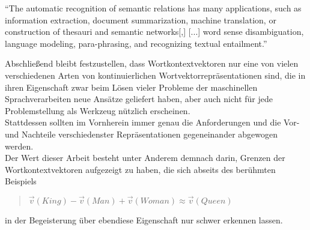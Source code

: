 \begin{itquote}
    ``The automatic recognition of semantic relations has many applications, such as information extraction,
    document summarization, machine translation, or construction of thesauri and semantic networks[,] [...]
    word sense disambiguation, language modeling, para-phrasing, and recognizing textual entailment.''
\end{itquote}

Abschließend bleibt festzustellen, dass Wortkontextvektoren nur eine von vielen verschiedenen Arten von kontinuierlichen
Wortvektorrepräsentationen sind, die in ihren Eigenschaft zwar beim Lösen vieler Probleme der maschinellen Sprachverarbeiten
neue Ansätze geliefert haben, aber auch nicht für jede Problemstellung als Werkzeug nützlich erscheinen.\\
Stattdessen sollten im Vornherein immer genau die Anforderungen und die Vor- und Nachteile verschiedenster Repräsentationen
gegeneinander abgewogen werden.\\

Der Wert dieser Arbeit besteht unter Anderem demnach darin, Grenzen der Wortkontextvektoren aufgezeigt zu haben, die sich abseits
des berühmten Beispiels

\begin{quote}
  $\vec{v}(King) - \vec{v}(Man) + \vec{v}(Woman) \approx \vec{v}(Queen)$
\end{quote}

in der Begeisterung über ebendiese Eigenschaft nur schwer erkennen lassen.
